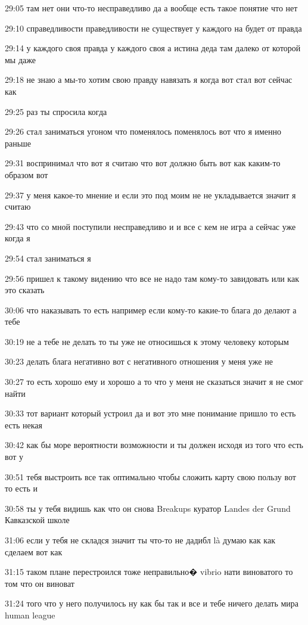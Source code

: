 29:05
там нет они что-то несправедливо да а вообще есть такое понятие что нет

29:10
справедливости праведливости не существует у каждого на будет от правда

29:14
у каждого своя правда у каждого своя а истина деда там далеко от которой мы даже

29:18
не знаю а мы-то хотим свою правду навязать я когда вот стал вот сейчас как

29:25
раз ты спросила когда

29:26
стал заниматься угоном что поменялось поменялось вот что я именно раньше

29:31
воспринимал что вот я считаю что вот должно быть вот как каким-то образом вот

29:37
у меня какое-то мнение и если это под моим не не укладывается значит я считаю

29:43
что со мной поступили несправедливо и и все с кем не игра а сейчас уже когда я

29:54
стал заниматься я

29:56
пришел к такому видению что все не надо там кому-то завидовать или как это сказать

30:06
что наказывать то есть например если кому-то какие-то блага до делают а тебе

30:19
не а тебе не делать то ты уже не относишься к этому человеку которым

30:23
делать блага негативно вот с негативного отношения у меня уже не

30:27
то есть хорошо ему и хорошо а то что у меня не сказаться значит я не смог найти

30:33
тот вариант который устроил да и вот это мне понимание пришло то есть есть некая

30:42
как бы море вероятности возможности и ты должен исходя из того что есть вот у

30:51
тебя выстроить все так оптимально чтобы сложить карту свою пользу вот то есть и

30:58
ты у тебя видишь как что он снова Breakups куратор Landes der Grund Кавказской школе

31:06
если у тебя не складся значит ты что-то не дадибл là думаю как как сделаем вот как

31:15
таком плане перестроился тоже неправильно� vibrio нати виноватого то том что он виноват

31:24
того что у него получилось ну как бы так и все и тебе ничего делать мира human league

